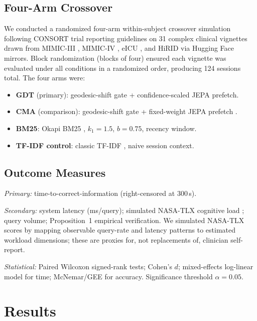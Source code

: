 \documentclass[review]{elsarticle}
\begin{document}
\subsection{Four-Arm Crossover}

We conducted a randomized four-arm within-subject crossover simulation following
CONSORT trial reporting guidelines \cite{schulz2010_consort,moher09} on 31 complex
clinical vignettes drawn from MIMIC-III \cite{johnson2016_mimic3}, MIMIC-IV
\cite{pollard2018_mimic4}, eICU \cite{pollard2018_eicu}, and HiRID
\cite{muller2021_hirid} via Hugging Face mirrors. Block randomization (blocks of
four) ensured each vignette was evaluated under all conditions in a randomized
order, producing 124 sessions total. The four arms were:
\begin{itemize}
  \item \textbf{GDT} (primary): geodesic-shift gate + confidence-scaled JEPA prefetch.
  \item \textbf{CMA} (comparison): geodesic-shift gate + fixed-weight JEPA prefetch \cite{cma2026,cma2026_clinical}.
  \item \textbf{BM25}: Okapi BM25 \cite{robertson1995,robertson1976}, $k_1{=}1.5$, $b{=}0.75$, recency window.
  \item \textbf{TF-IDF control}: classic TF-IDF \cite{salton83}, naive session context.
\end{itemize}

\subsection{Outcome Measures}

\textit{Primary:} time-to-correct-information (right-censored at 300\,s).

\textit{Secondary:} system latency (ms/query); simulated NASA-TLX cognitive load
\cite{hart1988}; query volume; Proposition~1 empirical verification. We simulated
NASA-TLX scores by mapping observable query-rate and latency patterns to estimated
workload dimensions; these are proxies for, not replacements of, clinician
self-report.

\textit{Statistical:} Paired Wilcoxon signed-rank tests; Cohen's $d$;
mixed-effects log-linear model for time; McNemar/GEE for accuracy. Significance
threshold $\alpha{=}0.05$.

\section{Results}
\label{sec:results}
\end{document}
